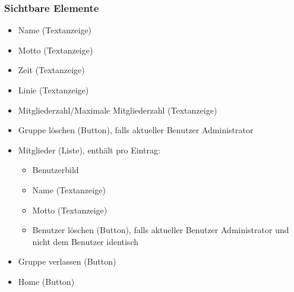 \documentclass[a4paper]{scrreprt}
\begin{document}
\subsubsection{Sichtbare Elemente}
\begin{itemize}
\item Name (Textanzeige)
\item Motto (Textanzeige)
\item Zeit (Textanzeige)
\item Linie (Textanzeige)
\item Mitgliederzahl/Maximale Mitgliederzahl (Textanzeige)
\item Gruppe löschen (Button), falls aktueller Benutzer Administrator
\item Mitglieder (Liste), enthält pro Eintrag:

\begin{itemize}
\item Benutzerbild
\item Name (Textanzeige)
\item Motto (Textanzeige)
\item Benutzer löschen (Button), falls aktueller Benutzer Administrator und nicht dem Benutzer identisch
\end{itemize}
 
\item Gruppe verlassen (Button)
\item Home (Button)
\end{itemize}
\end{document}
